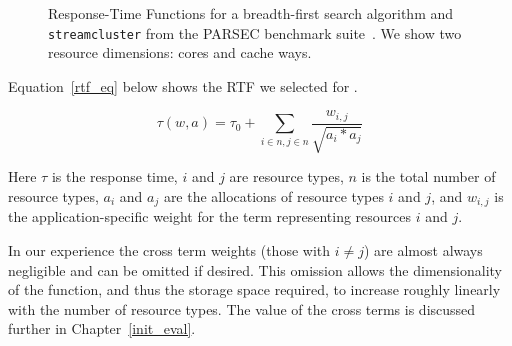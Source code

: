 \begin{figure}[hb]
\caption{\label{sample_rtf} Response-Time Functions for a
  breadth-first search algorithm and \texttt{streamcluster} from the PARSEC benchmark suite~\cite{parsec}. We show two resource dimensions: cores and cache ways.}
\end{figure}

Equation~\ref{rtf_eq} below shows the RTF we selected for \pacora.  

\begin{equation}\label{rtf_eq}
\tau(w,a) = \tau_0 + \sum_{i\in n,j\in n}{\frac{w_{i,j}}{\sqrt{a_i * a_j}}}
\end{equation}

Here $\tau$ is the response time, $i$ and $j$ are
resource types, $n$ is the total number of resource types,
$a_{i}$ and $a_{j}$ are the allocations of resource types $i$
and $j$, and $w_{i,j}$ is the application-specific weight for
the term representing resources $i$ and $j$.

In our experience the cross term weights (those with $i\neq j$) are almost always negligible and can be omitted if desired.
This omission allows the dimensionality of the function, and thus the storage space required, to increase roughly linearly with the number of resource types.  The value of the cross terms is discussed further in Chapter~\ref{init_eval}.

